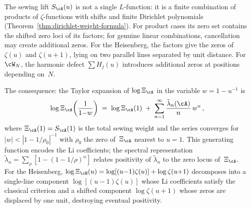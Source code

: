 \begin{remark}%
\label{rem:sewing-lift-two-line}%
%
The sewing lift $S_\cA(u)$ is not a single
$L$-function: it is a finite combination of products of
$\zeta$-functions with shifts and finite Dirichlet polynomials
\textup{(}Theorem~\textup{\ref{thm:dirichlet-weight-formula}}\textup{)}.
For product cases its zero set contains the shifted zero loci of its
factors; for genuine linear combinations, cancellation may create
additional zeros. For the Heisenberg, the factors give the zeros of
$\zeta(u)$ and $\zeta(u{+}1)$, lying on two parallel lines
separated by unit distance. For~$\cW_N$, the harmonic defect
$\sum H_j(u)$ introduces additional zeros at positions
depending on~$N$.

The consequence: the Taylor expansion of
$\log\Xi_\cA$ in the variable $w = 1 - u^{-1}$ is
\begin{equation}\label{eq:sewing-exponential-gf}
\log \Xi_\cA\!\left(\frac{1}{1{-}w}\right)
\;=\;
\log\Xi_\cA(1)
\;+\;
\sum_{n=1}^\infty
\frac{\tilde\lambda_n(\cA)}{n}\,w^n\,,
\end{equation}
where $\Xi_\cA(1) = S_\cA(1)$ is the total sewing weight
and the series converges for $|w| < |1 - 1/\rho_0|^{-1}$ with
$\rho_0$ the zero of~$\Xi_\cA$ nearest to $u = 1$.
This generating function encodes the Li coefficients;
the spectral representation
$\tilde\lambda_n = \sum_\rho[1 - (1{-}1/\rho)^n]$ relates
positivity of $\tilde\lambda_n$ to the zero locus of~$\Xi_\cA$.
For the Heisenberg,
$\log\Xi_\cH(u) = \log[(u{-}1)\zeta(u)] + \log\zeta(u{+}1)$
decomposes into a single-line component
$\log[(u{-}1)\zeta(u)]$ whose Li coefficients satisfy the
classical criterion and a shifted component $\log\zeta(u{+}1)$
whose zeros are displaced by one unit, destroying eventual
positivity.
\end{remark}

